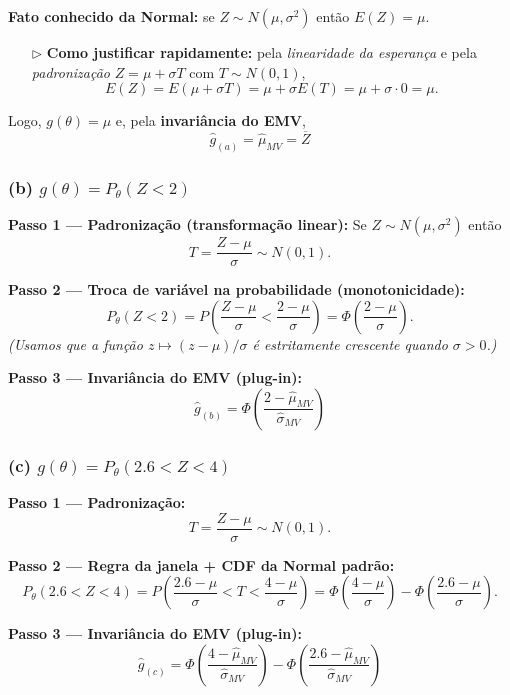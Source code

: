 \textbf{Fato conhecido da Normal:} se $Z \sim N(\mu,\sigma^2)$ então $E(Z)=\mu$.
\begin{itemize}
  \item[\(\triangleright\)] \textbf{Como justificar rapidamente:} pela \emph{linearidade da esperança} e pela
  \emph{padronização} $Z=\mu+\sigma T$ com $T\sim N(0,1)$,
  \[
  E(Z)=E(\mu+\sigma T)=\mu+\sigma E(T)=\mu+ \sigma\cdot 0=\mu .
  \]
\end{itemize}
Logo, $g(\theta)=\mu$ e, pela \textbf{invariância do EMV},
\[
\boxed{\;\widehat g_{(a)}=\widehat\mu_{MV}=\overline Z\;}
\]

\subsubsection*{(b) \; $g(\theta)=P_\theta(Z<2)$}

\textbf{Passo 1 — Padronização (transformação linear):}
Se $Z\sim N(\mu,\sigma^2)$ então
\[
T=\frac{Z-\mu}{\sigma}\sim N(0,1).
\]

\textbf{Passo 2 — Troca de variável na probabilidade (monotonicidade):}
\[
P_\theta(Z<2)=P\!\left(\frac{Z-\mu}{\sigma}<\frac{2-\mu}{\sigma}\right)
=\Phi\!\left(\frac{2-\mu}{\sigma}\right).
\]
\emph{(Usamos que a função $z\mapsto (z-\mu)/\sigma$ é estritamente crescente quando $\sigma>0$.)}

\textbf{Passo 3 — Invariância do EMV (plug-in):}
\[
\boxed{\;\widehat g_{(b)}=\Phi\!\left(\frac{2-\widehat\mu_{MV}}{\widehat\sigma_{MV}}\right)\;}
\]

\subsubsection*{(c) \; $g(\theta)=P_\theta(2.6<Z<4)$}

\textbf{Passo 1 — Padronização:}
\[
T=\frac{Z-\mu}{\sigma}\sim N(0,1).
\]

\textbf{Passo 2 — Regra da janela + CDF da Normal padrão:}
\[
P_\theta(2.6<Z<4)=P\!\left(\frac{2.6-\mu}{\sigma}<T<\frac{4-\mu}{\sigma}\right)
=\Phi\!\left(\frac{4-\mu}{\sigma}\right)-\Phi\!\left(\frac{2.6-\mu}{\sigma}\right).
\]

\textbf{Passo 3 — Invariância do EMV (plug-in):}
\[
\boxed{\;\widehat g_{(c)}=\Phi\!\left(\frac{4-\widehat\mu_{MV}}{\widehat\sigma_{MV}}\right)
-\Phi\!\left(\frac{2.6-\widehat\mu_{MV}}{\widehat\sigma_{MV}}\right)\;}
\]

